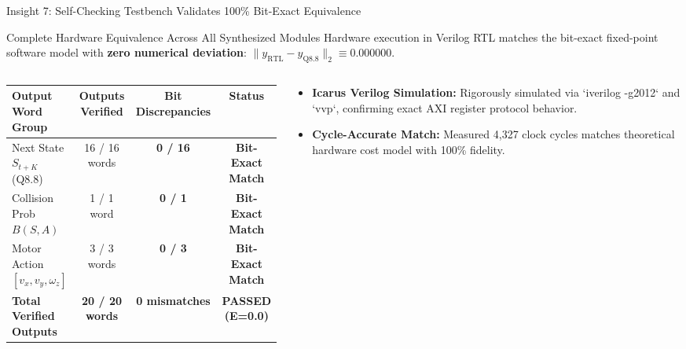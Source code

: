 \documentclass[aspectratio=169, 10pt]{beamer}
\begin{document}
\begin{frame}{Insight 7: Self-Checking Testbench Validates 100\% Bit-Exact Equivalence}
  \begin{block}{Complete Hardware Equivalence Across All Synthesized Modules}
    Hardware execution in Verilog RTL matches the bit-exact fixed-point software model with \textbf{zero numerical deviation}: $\|y_{\text{RTL}} - y_{\text{Q8.8}}\|_2 \equiv 0.000000$.
  \end{block}
  \vspace{-0.2cm}
  \begin{columns}[T]
    \begin{column}{0.52\textwidth}
      \setlength{\tabcolsep}{2pt}
      \begin{table}
        \centering
        \scriptsize
        \begin{tabular}{lccc}
          \toprule
          \textbf{Output Word Group} & \textbf{Outputs Verified} & \textbf{Bit Discrepancies} & \textbf{Status} \\
          \midrule
          Next State $S_{t+K}$ (Q8.8) & 16 / 16 words & \textbf{0 / 16} & \textbf{Bit-Exact Match} \\
          Collision Prob $B(S, A)$ & 1 / 1 word & \textbf{0 / 1} & \textbf{Bit-Exact Match} \\
          Motor Action $[v_x, v_y, \omega_z]$ & 3 / 3 words & \textbf{0 / 3} & \textbf{Bit-Exact Match} \\
          \midrule
          \textbf{Total Verified Outputs} & \textbf{20 / 20 words} & \textbf{0 mismatches} & \textbf{PASSED (E=0.0)} \\
          \bottomrule
        \end{tabular}
      \end{table}
    \end{column}
    \begin{column}{0.46\textwidth}
      \begin{itemize}
        \item \textbf{Icarus Verilog Simulation:} Rigorously simulated via `iverilog -g2012` and `vvp`, confirming exact AXI register protocol behavior.
        \item \textbf{Cycle-Accurate Match:} Measured 4,327 clock cycles matches theoretical hardware cost model with 100\% fidelity.
      \end{itemize}
    \end{column}
  \end{columns}
\end{frame}
\end{document}
